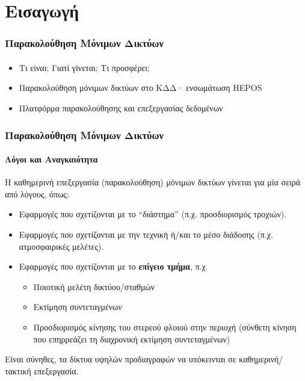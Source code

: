 \graphicspath{{Chapter1/Figs/}}

\section{Εισαγωγή}

\begin{frame}\frametitle{Παρακολούθηση Μόνιμων Δικτύων}\framesubtitle{}\label{}
\vskip-1.5cm
        \begin{itemize}
            \item Τι είναι; Γιατί γίνεται; Τι προσφέρει;
            \item Παρακολούθηση μόνιμων δικτύων στο ΚΔΔ· ενσωμάτωση HEPOS
            \item Πλατφόρμα παρακολούθησης και επεξεργασίας δεδομένων
        \end{itemize}
\end{frame}

\begin{frame}
  \frametitle{Παρακολούθηση Μόνιμων Δικτύων}
  \framesubtitle{Λόγοι και Αναγκαιότητα}
  \label{}

    Η καθημερινή επεξεργασία (παρακολούθηση) μόνιμων δικτύων γίνεται για μία σειρά από λόγους,
    όπως:
    \begin{itemize}
        \item Εφαρμογές που σχετίζονται με το ``διάστημα'' (π.χ. προσδιορισμός τροχιών).
        \item Εφαρμογές που σχετίζονται με την τεχνική ή/και το μέσο διάδοσης (π.χ. ατμοσφαιρικές μελέτες).
        \item Εφαρμογές που σχετίζονται με το \textbf{επίγειο τμήμα}, π.χ.
        \begin{itemize}
            \item Ποιοτική μελέτη δικτύου/σταθμών
            \item Εκτίμηση συντεταγμένων
            \item Προσδιορισμός κίνησης του στερεού φλοιού στην περιοχή (σύνθετη κίνηση που επηρρεάζει τη διαχρονική εκτίμηση συντεταγμένων)
        \end{itemize}
    \end{itemize}
    Είναι σύνηθες, τα δίκτυα υψηλών προδιαγραφών να υπόκεινται σε καθημερινή/τακτική επεξεργασία.
\end{frame}
\note{}

